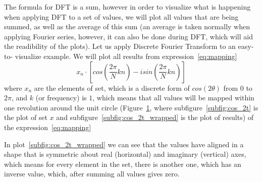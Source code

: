 \documentclass[titlepage]{article}
\begin{document}
    The formula for DFT is a sum, however in order to visualize what is happening
    when applying DFT to a set of values, we will plot all values that are being
    summed, as well as the average of this sum (an average is taken normally when
    applying Fourier series, however, it can also be done during DFT, which will
    aid the readibility of the plots).
    Let us apply Discrete Fourier Transform to an easy-to-
    visualize example. We will plot all results from expression~\eqref{eq:mapping}
    \begin{equation}\label{eq:mapping}
        x_n \cdot \left[cos\left(\frac{2\pi}{N}kn\right) - isin\left(
            \frac{2\pi}{N}kn\right)\right]
    \end{equation}
    where $x_n$ are the elements of set, which is a discrete
    form of $cos(2\theta)$ from $0$ to $2\pi$, and $k$ (or frequency) is $1$, which 
    means that all values will be mapped within one revolution around the unit circle
    (Figure~\ref{fig:cos_wrapped}, where subfigure~\ref{subfig:cos_2t} is the plot
    of set $x$ and subfigure~\ref{subfig:cos_2t_wrapped} is the plot of results)
    of the expression~\eqref{eq:mapping}
    \begin{figure}[H]
      \caption{}\label{fig:cos_wrapped}
      \centering
      \hfill
    \end{figure}
    In plot~\ref{subfig:cos_2t_wrapped} we can see that the values have aligned
    in a shape that is symmetric about real (horizontal) and imaginary (vertical)
    axes, which means for every element in the set, there is another one, which
    has an inverse value, which, after summing all values gives zero. 
\end{document}
